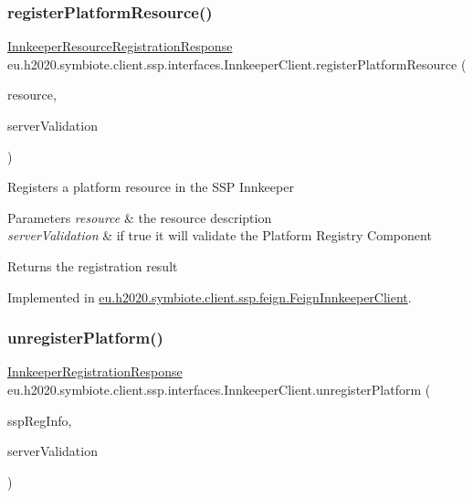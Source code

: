 \subsubsection{\texorpdfstring{register\+Platform\+Resource()}{registerPlatformResource()}}
{\footnotesize\ttfamily \hyperlink{classeu_1_1h2020_1_1symbiote_1_1ssp_1_1model_1_1InnkeeperResourceRegistrationResponse}{Innkeeper\+Resource\+Registration\+Response} eu.\+h2020.\+symbiote.\+client.\+ssp.\+interfaces.\+Innkeeper\+Client.\+register\+Platform\+Resource (\begin{DoxyParamCaption}\item[{\hyperlink{classeu_1_1h2020_1_1symbiote_1_1cloud_1_1model_1_1ssp_1_1SspResource}{Ssp\+Resource}}]{resource,  }\item[{boolean}]{server\+Validation }\end{DoxyParamCaption})}

Registers a platform resource in the S\+SP Innkeeper 
\begin{DoxyParams}{Parameters}
{\em resource} & the resource description \\
\hline
{\em server\+Validation} & if true it will validate the Platform Registry Component \\
\hline
\end{DoxyParams}
\begin{DoxyReturn}{Returns}
the registration result 
\end{DoxyReturn}


Implemented in \hyperlink{classeu_1_1h2020_1_1symbiote_1_1client_1_1ssp_1_1feign_1_1FeignInnkeeperClient_ac6576ba5db1d2317917ec0d7237e63f1}{eu.\+h2020.\+symbiote.\+client.\+ssp.\+feign.\+Feign\+Innkeeper\+Client}.

\mbox{\label{interfaceeu_1_1h2020_1_1symbiote_1_1client_1_1ssp_1_1interfaces_1_1InnkeeperClient_a9f8da16b1de6aef89ae679dca5a9592c}} 
\subsubsection{\texorpdfstring{unregister\+Platform()}{unregisterPlatform()}}
{\footnotesize\ttfamily \hyperlink{classeu_1_1h2020_1_1symbiote_1_1ssp_1_1model_1_1InnkeeperRegistrationResponse}{Innkeeper\+Registration\+Response} eu.\+h2020.\+symbiote.\+client.\+ssp.\+interfaces.\+Innkeeper\+Client.\+unregister\+Platform (\begin{DoxyParamCaption}\item[{\hyperlink{classeu_1_1h2020_1_1symbiote_1_1cloud_1_1model_1_1ssp_1_1SspRegInfo}{Ssp\+Reg\+Info}}]{ssp\+Reg\+Info,  }\item[{boolean}]{server\+Validation }\end{DoxyParamCaption})}

